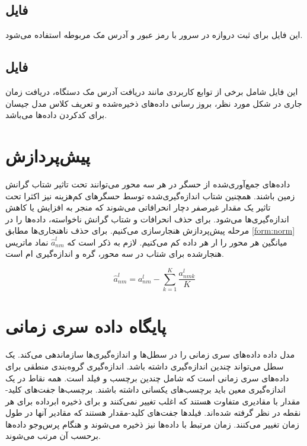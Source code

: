 \subsection{فایل }

این فایل برای ثبت دروازه در سرور با رمز عبور و آدرس مک مربوطه استفاده می‌شود.

\subsection{فایل }

این فایل شامل برخی از توابع کاربردی مانند دریافت آدرس مک دستگاه، دریافت زمان جاری در شکل مورد نظر، بروز رسانی داده‌های ذخیره‌شده و تعریف کلاس مدل جیسان برای کد‌کردن داده‌ها می‌باشد.

\section{پیش‌پردازش}

داده‌های جمع‌آوری‌شده از حسگر در هر سه محور می‌توانند تحت تاثیر شتاب گرانش زمین باشند. همچنین شتاب اندازه‌گیری‌شده توسط حسگرهای کم‌هزینه  نیز اکثرا تحت تاثیر یک مقدار غیرصفر دچار انحرافاتی می‌شوند که منجر به افزایش یا کاهش اندازه‌گیری‌ها می‌شود\cite{jung2017vibration}. برای حذف انحرافات و شتاب گرانش ناخواسته، داده‌ها را در مرحله پیش‌پردازش هنجارسازی می‌کنیم. برای حذف ناهنجاری‌ها مطابق \cref{form:norm} میانگین هر محور را ار هر داده کم می‌کنیم. لازم به ذکر است که $\hat{a}^l_{nm}$ نماد ماتریس هنجارشده برای شتاب در سه محور، گره  و اندازه‌گیری ام است.

\begin{equation}
\label{form:norm}
\hat{a}^l_{nm}=a^l_{nm}-\sum_{k=1}^K \dfrac{a^l_{nmk}}{K}
\end{equation}

\section{پایگاه داده سری زمانی}

مدل داده  داده‌های سری زمانی را در سطل‌ها و اندازه‌گیری‌ها سازماندهی می‌کند. یک سطل می‌تواند چندین اندازه‌گیری داشته باشد. اندازه‌گیری گروه‌بندی منطقی برای داده‌های سری زمانی است که شامل چندین برچسب و فیلد است. همه نقاط در یک اندازه‌گیری معین باید برچسب‌های یکسانی داشته باشند. برچسب‌ها جفت‌های کلید-مقدار با مقادیری متفاوت هستند که اغلب تغییر نمی‌کنند و برای ذخیره ابرداده برای هر نقطه در نظر گرفته شده‌اند. فیلدها جفت‌های کلید-مقدار هستند که مقادیر آنها در طول زمان تغییر می‌کنند. زمان مرتبط با داده‌ها نیز ذخیره می‌شوند و هنگام پرس‌وجو داده‌ها برحسب آن مرتب می‌شوند\cite{influx_doc}.



